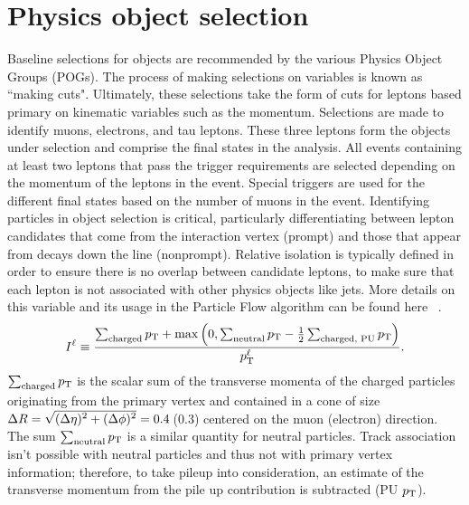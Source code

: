 \section{Physics object selection} 
\label{sec:objsel}
Baseline selections for objects are recommended by the various Physics Object Groups (POGs). The process of making selections on variables is known as ``making cuts". Ultimately, these selections take the form of cuts for leptons based primary on kinematic variables such as the momentum. 
Selections are made to identify muons, electrons, and tau leptons. These three leptons form the objects under selection and comprise the final states in the analysis.
All events containing at least two leptons that pass the trigger requirements are selected depending on the momentum of the leptons in the event. Special triggers are used for the different final states based on the number of muons in the event. 
Identifying particles in object selection is critical, particularly differentiating between lepton candidates that come from the interaction vertex (prompt) and those that appear from decays down the line (nonprompt). Relative isolation is typically defined in order to ensure there is no overlap between candidate leptons, to make sure that each lepton is not associated with other physics objects like jets. More details on this variable and its usage in the Particle Flow algorithm can be found here  ~\cite{Sirunyan_2017}. 
\begin{equation}
I^{\ell} \equiv \frac{\sum_\text{charged}  p_{\mathrm{T}} + \max\left( 0, \sum_\text{neutral}  p_{\mathrm{T}}
                                         - \frac{1}{2} \sum_\text{charged, PU} p_{\mathrm{T}}  \right )}{p_{\mathrm{T}}^{\ell}}.
\label{eq:reconstruction_isolation}
\end{equation}
$\sum_\text{charged}  p_{\mathrm{T}}$ is the scalar sum of the
transverse momenta of the charged particles originating from
the primary vertex and contained in a cone of size
$\Delta R = \sqrt{\smash[b]{(\Delta \eta)^2 + (\Delta \phi)^2}} = 0.4$\,(0.3)
centered on the muon (electron) direction. The sum $\sum_\text{neutral}  p_{\mathrm{T}}$ is
a similar quantity for neutral particles. Track association isn't possible with neutral particles and thus not with primary vertex information; therefore, to take pileup into consideration, an estimate of the transverse momentum from the pile up contribution is subtracted (PU $p_{\mathrm{T}}$).  

